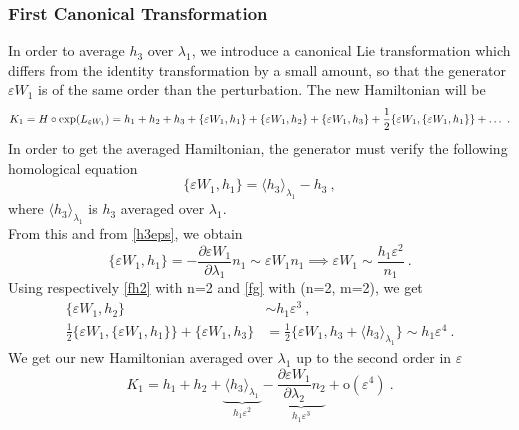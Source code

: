 \documentclass[a4paper]{article}
\begin{document}
\subsubsection{First Canonical Transformation}
\label{FCT}
In order to average $h_{3}$ over $\lambda_{1}$, we introduce a canonical Lie transformation which differs from the identity transformation by a small amount, so that the generator $\varepsilon W_{1}$ is of the same order than the perturbation. 
The new Hamiltonian will be 
\begin{equation}
K_{1}=H \circ \exp (L_{\varepsilon W_{1}})=h_{1}+h_{2}+h_{3}+\{\varepsilon W_{1},h_{1}\}+\{\varepsilon W_{1},h_{2}\}+\{\varepsilon W_{1},h_{3}\}\\+\frac{1}{2}\{\varepsilon W_{1},\{\varepsilon W_{1},h_{1}\}\}+\ldots \ .
\label{K1}
\end{equation} 
In order to get the averaged Hamiltonian, the generator must verify the following homological equation 
\begin{equation}
\{\varepsilon W_{1},h_{1}\}= \langle h_{3} \rangle _{\lambda_{1}}-h_{3} \ ,
\label{he1} 
\end{equation} 
where $ \langle h_{3} \rangle _{\lambda_{1}}$ is $h_{3}$ averaged over $\lambda_{1}$. \\
From this and from \eqref{h3eps}, we obtain 
\begin{equation}
\{\varepsilon W_{1},h_{1}\}=-\frac{\partial \varepsilon W_{1}}{\partial \lambda_{1}}n_{1}
\sim \varepsilon W_{1} n_{1} \implies \varepsilon W_{1}\sim \frac{h_{1}\varepsilon^{2}}{n_{1}} \ .
\label{w1eps}
\end{equation} 
Using respectively \eqref{fh2} with n=2 and \eqref{fg} with (n=2, m=2), we get
\begin{align}
\label{pb1}
\{\varepsilon W_{1},h_{2}\} &\sim h_{1}\varepsilon^{3} \ , \\
\frac{1}{2}\{\varepsilon W_{1},\{\varepsilon W_{1},h_{1}\}\}+\{\varepsilon W_{1},h_{3}\} &= \frac{1}{2}\{\varepsilon W_{1},h_{3}+ \langle h_{3} \rangle _{\lambda_{1}}\}\sim h_{1}\varepsilon^{4} \ .
\end{align}
We get our new Hamiltonian averaged over $\lambda_{1}$ up to the second order in $\varepsilon$
\begin{equation}
K_{1}=h_{1}+h_{2}+\underbrace{ \langle h_{3} \rangle _{\lambda_{1}}}_{h_{1}\varepsilon^{2}}-\underbrace{\frac{\partial \varepsilon W_{1}}{\partial \lambda_{2}}n_{2}}_{h_{1}\varepsilon^{3}}+\text{o}(\varepsilon^{4}) \ .
\label{K11}
\end{equation}
\end{document}

